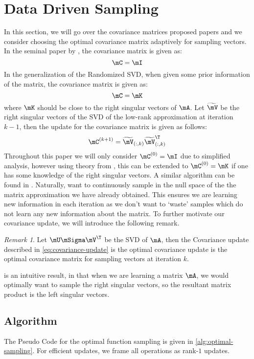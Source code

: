 \documentclass[10pt]{article}
\newcommand{\ccref}[1]{\textcolor{darkred}{\cref{#1}}}
\newcommand{\Ccref}[1]{\textcolor{darkred}{\Cref{#1}}}
\theoremstyle{plain}
\theoremstyle{definition}
\theoremstyle{remark}
\newtheorem{remark}[theorem]{Remark}
\begin{document}
\section{Data Driven Sampling} 
In this section, we will go over the covariance matrices proposed papers and we consider choosing the optimal covariance matrix adaptively for sampling vectors. In the seminal paper by \cite{halko:2011}, the covariance matrix is given as:
\begin{equation}
	\mC = \mI
\end{equation}
In the generalization of the Randomized SVD, when given some prior information of the matrix, the covariance matrix is given as:
\begin{equation}
	\mC = \mK
\end{equation}
where $\mK$ should be close to the right singular vectors of $\mA$. 
Let $\widetilde{\mV}$ be the right singular vectors of the SVD of the low-rank approximation at iteration $k-1$, then the update for the covariance matrix is given as follows:
\begin{equation} 
	\mC^{(k+1)} = \widetilde{\mV}_{(:,k)}\widetilde{\mV}_{(:,k)}^{\T}\label{eq:covariance-update}
\end{equation}
Throughout this paper we will only consider $\mC^{(0)} = \mI$ due to simplified analysis, however using theory from \cite{boulle:2022}, this can be extended to $\mC^{(0)} = \mK$ if one has some knowledge of the right singular vectors. A similar algorithm can be found in \cite{wang:2021}. Naturally, want to continuously sample in the null space of the the matrix approximation we have already obtained. This ensures we are learning new information in each iteration as we don't want to `waste' samples which do not learn any new information about the matrix. To further motivate our covariance update, we will introduce the following remark.
\begin{remark}\label{rem:optimal-sampling}
	Let $\mU \mSigma \mV^{\T}$ be the SVD of $\mA$, then the Covariance update described in \ccref{eq:covariance-update} is the optimal covariance update
	is the optimal covariance matrix for sampling vectors at iteration $k$. 
\end{remark}
\Ccref{rem:optimal-sampling} is an intuitive result, in that when we are learning a matrix $\mA$, we would optimally want to sample the right singular vectors, so the resultant matrix product is the left singular vectors. 
\subsection{Algorithm}
The Pseudo Code for the optimal function sampling is given in \ccref{alg:optimal-sampling}. For efficient updates, we frame all operations as rank-$1$ updates. \\
\end{document}

